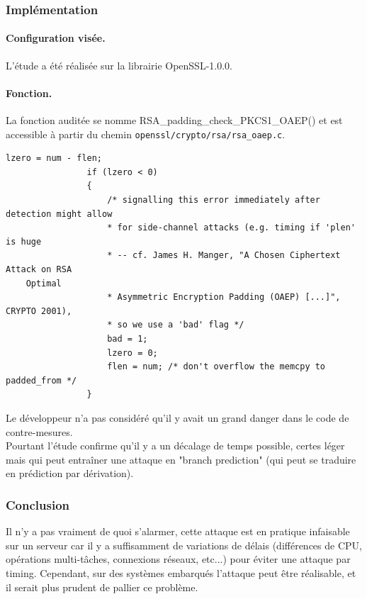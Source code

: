 		
		\subsubsection{Implémentation}
			
			\paragraph{Configuration visée.\\}
			
			L'étude a été réalisée sur la librairie OpenSSL-1.0.0.
			
			\paragraph{Fonction.\\}
			
			La fonction auditée se nomme RSA\_padding\_check\_PKCS1\_OAEP() et est accessible à partir du chemin \texttt{openssl/crypto/rsa/rsa\_oaep.c}.
		
		
			\begin{lstlisting}[style=customc,caption=rsa\_oaep.c,
			label=rsaoaep]
				lzero = num - flen;
				if (lzero < 0)
				{
					/* signalling this error immediately after detection might allow
					* for side-channel attacks (e.g. timing if 'plen' is huge
					* -- cf. James H. Manger, "A Chosen Ciphertext Attack on RSA
	Optimal
					* Asymmetric Encryption Padding (OAEP) [...]", CRYPTO 2001),
					* so we use a 'bad' flag */
					bad = 1;
					lzero = 0;
					flen = num; /* don't overflow the memcpy to padded_from */
				}
			\end{lstlisting}
		
			Le développeur n'a pas considéré qu'il y avait un grand danger dans le code de contre-mesures.\\
			Pourtant l'étude confirme qu'il y a un décalage de temps possible, certes léger mais qui peut entraîner une attaque en "branch prediction" (qui peut se traduire en prédiction par dérivation).\\
			
		\subsubsection{Conclusion}
		
			Il n'y a pas vraiment de quoi s'alarmer, cette attaque est en pratique infaisable sur un serveur car il y a suffisamment de variations de délais (différences de CPU, opérations multi-tâches, connexions réseaux, etc...) pour éviter une attaque par timing. Cependant, sur des systèmes embarqués l'attaque peut être réalisable, et il serait plus prudent de pallier ce problème.
			
